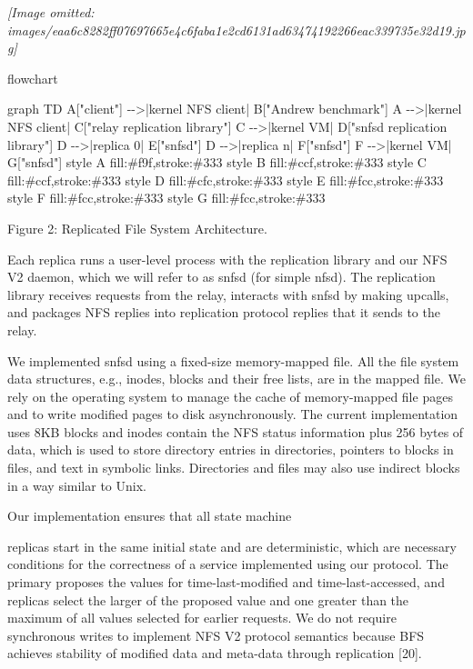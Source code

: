 \documentclass[
]{article}
\newenvironment{Shaded}{}{}
\newcommand{\NormalTok}[1]{#1}
\begin{document}
\textit{[Image omitted: images/eaa6c8282ff07697665e4c6faba1e2cd6131ad63474192266eac339735e32d19.jpg]}

flowchart

\begin{Shaded}
\begin{Highlighting}[]
\NormalTok{graph TD}
\NormalTok{    A["client"] {-}{-}\textgreater{}|kernel NFS client| B["Andrew benchmark"]}
\NormalTok{    A {-}{-}\textgreater{}|kernel NFS client| C["relay replication library"]}
\NormalTok{    C {-}{-}\textgreater{}|kernel VM| D["snfsd replication library"]}
\NormalTok{    D {-}{-}\textgreater{}|replica 0| E["snfsd"]}
\NormalTok{    D {-}{-}\textgreater{}|replica n| F["snfsd"]}
\NormalTok{    F {-}{-}\textgreater{}|kernel VM| G["snfsd"]}
\NormalTok{    style A fill:\#f9f,stroke:\#333}
\NormalTok{    style B fill:\#ccf,stroke:\#333}
\NormalTok{    style C fill:\#ccf,stroke:\#333}
\NormalTok{    style D fill:\#cfc,stroke:\#333}
\NormalTok{    style E fill:\#fcc,stroke:\#333}
\NormalTok{    style F fill:\#fcc,stroke:\#333}
\NormalTok{    style G fill:\#fcc,stroke:\#333}
\end{Highlighting}
\end{Shaded}

Figure 2: Replicated File System Architecture.

Each replica runs a user-level process with the replication library and
our NFS V2 daemon, which we will refer to as snfsd (for simple nfsd).
The replication library receives requests from the relay, interacts with
snfsd by making upcalls, and packages NFS replies into replication
protocol replies that it sends to the relay.

We implemented snfsd using a fixed-size memory-mapped file. All the file
system data structures, e.g., inodes, blocks and their free lists, are
in the mapped file. We rely on the operating system to manage the cache
of memory-mapped file pages and to write modified pages to disk
asynchronously. The current implementation uses 8KB blocks and inodes
contain the NFS status information plus 256 bytes of data, which is used
to store directory entries in directories, pointers to blocks in files,
and text in symbolic links. Directories and files may also use indirect
blocks in a way similar to Unix.

Our implementation ensures that all state machine

replicas start in the same initial state and are deterministic, which
are necessary conditions for the correctness of a service implemented
using our protocol. The primary proposes the values for
time-last-modified and time-last-accessed, and replicas select the
larger of the proposed value and one greater than the maximum of all
values selected for earlier requests. We do not require synchronous
writes to implement NFS V2 protocol semantics because BFS achieves
stability of modified data and meta-data through replication {[}20{]}.
\end{document}
